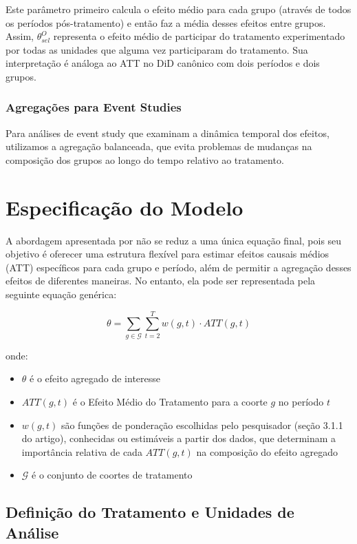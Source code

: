 \documentclass[
	12pt,				%
	oneside,			%
	a4paper,			%
	english,			%
	french,				%
	spanish,			%
	brazil				%
	]{abntex2}
\begin{document}
Este parâmetro primeiro calcula o efeito médio para cada grupo (através de todos os períodos pós-tratamento) e então faz a média desses efeitos entre grupos. Assim, $\theta^O_{sel}$ representa o efeito médio de participar do tratamento experimentado por todas as unidades que alguma vez participaram do tratamento. Sua interpretação é análoga ao ATT no DiD canônico com dois períodos e dois grupos.

\subsubsection{Agregações para Event Studies}

Para análises de event study que examinam a dinâmica temporal dos efeitos, utilizamos a agregação balanceada, que evita problemas de mudanças na composição dos grupos ao longo do tempo relativo ao tratamento.

\section{Especificação do Modelo}

A abordagem apresentada por  não se reduz a uma única equação final, pois seu objetivo é oferecer uma estrutura flexível para estimar efeitos causais médios (ATT) específicos para cada grupo e período, além de permitir a agregação desses efeitos de diferentes maneiras. No entanto, ela pode ser representada pela seguinte equação genérica:

\begin{equation}
\theta = \sum_{g \in \mathcal{G}} \sum_{t=2}^{T} w(g,t) \cdot ATT(g,t)
\end{equation}

onde:
\begin{itemize}
\item $\theta$ é o efeito agregado de interesse
\item $ATT(g,t)$ é o Efeito Médio do Tratamento para a coorte $g$ no período $t$
\item $w(g,t)$ são funções de ponderação escolhidas pelo pesquisador (seção 3.1.1 do artigo), conhecidas ou estimáveis a partir dos dados, que determinam a importância relativa de cada $ATT(g,t)$ na composição do efeito agregado
\item $\mathcal{G}$ é o conjunto de coortes de tratamento
\end{itemize}


\subsection{Definição do Tratamento e Unidades de Análise}
\end{document}

